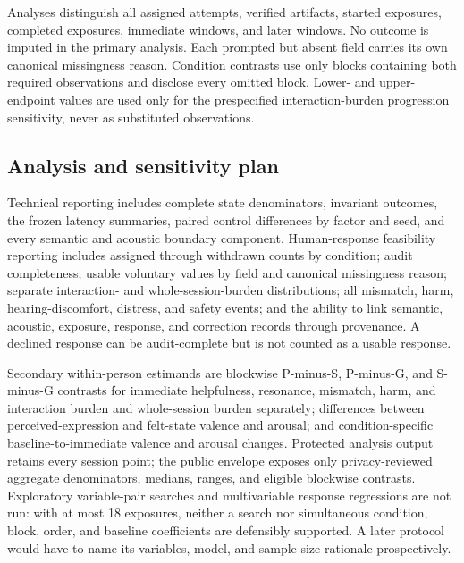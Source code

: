 Analyses distinguish all assigned attempts, verified artifacts, started
exposures, completed exposures, immediate windows, and later windows. No outcome
is imputed in the primary analysis. Each prompted but absent field carries its
own canonical missingness reason. Condition contrasts use only blocks containing
both required observations and disclose every omitted block. Lower- and
upper-endpoint values are used only for the prespecified interaction-burden
progression sensitivity, never as substituted observations.

\subsection{Analysis and sensitivity plan}
\label{sec:methods-analysis-plan}

Technical reporting includes complete state denominators, invariant outcomes,
the frozen latency summaries, paired control differences by factor and seed,
and every semantic and acoustic boundary component. Human-response feasibility
reporting includes assigned through withdrawn counts by condition; audit
completeness; usable voluntary values by field and canonical missingness reason;
separate interaction- and whole-session-burden distributions; all mismatch,
harm, hearing-discomfort, distress, and safety events; and the ability to link
semantic, acoustic, exposure, response, and correction records through
provenance. A declined response can be audit-complete but is not counted as a
usable response.

Secondary within-person estimands are blockwise P-minus-S, P-minus-G, and
S-minus-G contrasts for immediate helpfulness, resonance, mismatch, harm, and
interaction burden and whole-session burden separately; differences between
perceived-expression and felt-state valence and arousal; and condition-specific
baseline-to-immediate valence and arousal changes. Protected analysis output
retains every session point; the public envelope exposes only privacy-reviewed
aggregate denominators, medians, ranges, and eligible blockwise contrasts.
Exploratory variable-pair searches and multivariable response regressions are
not run: with at most 18 exposures, neither a search nor simultaneous condition,
block, order, and baseline coefficients are defensibly supported. A later
protocol would have to name its variables, model, and sample-size rationale
prospectively.

